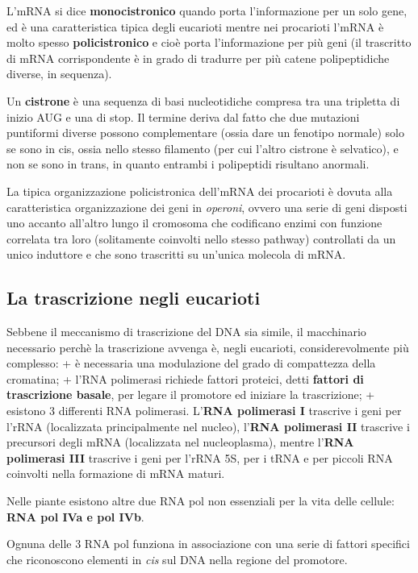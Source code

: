 \documentclass[11pt]{book}
\begin{document}
L'mRNA si dice \textbf{monocistronico} quando porta l'informazione per
un solo gene, ed è una caratteristica tipica degli eucarioti mentre nei
procarioti l'mRNA è molto spesso \textbf{policistronico} e cioè porta
l'informazione per più geni (il trascritto di mRNA corrispondente è in
grado di tradurre per più catene polipeptidiche diverse, in sequenza).

Un \textbf{cistrone} è una sequenza di basi nucleotidiche compresa tra
una tripletta di inizio AUG e una di stop. Il termine deriva dal fatto
che due mutazioni puntiformi diverse possono complementare (ossia dare
un fenotipo normale) solo se sono in cis, ossia nello stesso filamento
(per cui l'altro cistrone è selvatico), e non se sono in trans, in
quanto entrambi i polipeptidi risultano anormali.

La tipica organizzazione policistronica dell'mRNA dei procarioti è
dovuta alla caratteristica organizzazione dei geni in \emph{operoni},
ovvero una serie di geni disposti uno accanto all'altro lungo il
cromosoma che codificano enzimi con funzione correlata tra loro
(solitamente coinvolti nello stesso pathway) controllati da un unico
induttore e che sono trascritti su un'unica molecola di mRNA.

\subsection{La trascrizione negli
eucarioti}\label{la-trascrizione-negli-eucarioti}

Sebbene il meccanismo di trascrizione del DNA sia simile, il macchinario
necessario perchè la trascrizione avvenga è, negli eucarioti,
considerevolmente più complesso: + è necessaria una modulazione del
grado di compattezza della cromatina; + l'RNA polimerasi richiede
fattori proteici, detti \textbf{fattori di trascrizione basale}, per
legare il promotore ed iniziare la trascrizione; + esistono 3 differenti
RNA polimerasi. L'\textbf{RNA polimerasi I} trascrive i geni per l'rRNA
(localizzata principalmente nel nucleo), l'\textbf{RNA polimerasi II}
trascrive i precursori degli mRNA (localizzata nel nucleoplasma), mentre
l'\textbf{RNA polimerasi III} trascrive i geni per l'rRNA 5S, per i tRNA
e per piccoli RNA coinvolti nella formazione di mRNA maturi.

Nelle piante esistono altre due RNA pol non essenziali per la vita delle
cellule: \textbf{RNA pol IVa e pol IVb}.

Ognuna delle 3 RNA pol funziona in associazione con una serie di fattori
specifici che riconoscono elementi in \emph{cis} sul DNA nella regione
del promotore.
\end{document}
